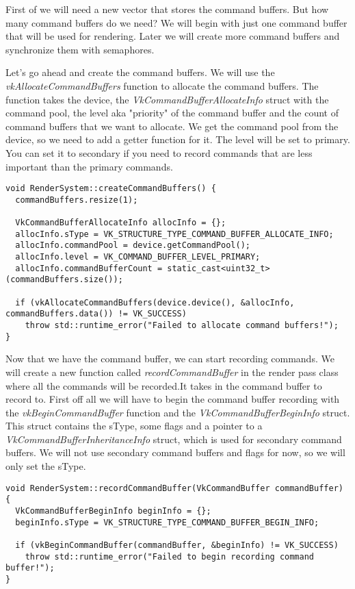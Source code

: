 \documentclass[12pt]{report} \usepackage{preamble}
\begin{document}
First of we will need a new vector that stores the command buffers. But how many command buffers do we need? We will begin with
just one command buffer that will be used for rendering. Later we will create more command buffers and synchronize them with
semaphores.

Let's go ahead and create the command buffers. We will use the \textit{vkAllocateCommandBuffers} function to allocate the
command buffers. The function takes the device, the \textit{VkCommandBufferAllocateInfo} struct with the command pool,
the level aka "priority" of the command buffer and the count of command buffers that we want to allocate. We get
the command pool from the device, so we need to add a getter function for it. The level will be set to primary. You can
set it to secondary if you need to record commands that are less important than the primary commands.

\begin{lstlisting}[Language=C++]
void RenderSystem::createCommandBuffers() {
  commandBuffers.resize(1);

  VkCommandBufferAllocateInfo allocInfo = {};
  allocInfo.sType = VK_STRUCTURE_TYPE_COMMAND_BUFFER_ALLOCATE_INFO;
  allocInfo.commandPool = device.getCommandPool();
  allocInfo.level = VK_COMMAND_BUFFER_LEVEL_PRIMARY;
  allocInfo.commandBufferCount = static_cast<uint32_t>(commandBuffers.size());

  if (vkAllocateCommandBuffers(device.device(), &allocInfo, commandBuffers.data()) != VK_SUCCESS)
    throw std::runtime_error("Failed to allocate command buffers!");
}
\end{lstlisting}

Now that we have the command buffer, we can start recording commands. We will create a new function called \textit{recordCommandBuffer}
in the render pass class where all the commands will be recorded.It takes in the command buffer to record to.
First off all we will have to begin the command buffer recording
with the \textit{vkBeginCommandBuffer} function and the \textit{VkCommandBufferBeginInfo} struct. This struct contains the sType,
some flags and a pointer to a \textit{VkCommandBufferInheritanceInfo} struct, which is used for secondary command buffers. We will
not use secondary command buffers and flags for now, so we will only set the sType.

\begin{lstlisting}[Language=C++]
void RenderSystem::recordCommandBuffer(VkCommandBuffer commandBuffer) {
  VkCommandBufferBeginInfo beginInfo = {};
  beginInfo.sType = VK_STRUCTURE_TYPE_COMMAND_BUFFER_BEGIN_INFO;

  if (vkBeginCommandBuffer(commandBuffer, &beginInfo) != VK_SUCCESS)
    throw std::runtime_error("Failed to begin recording command buffer!");
}
\end{lstlisting}
\end{document}

